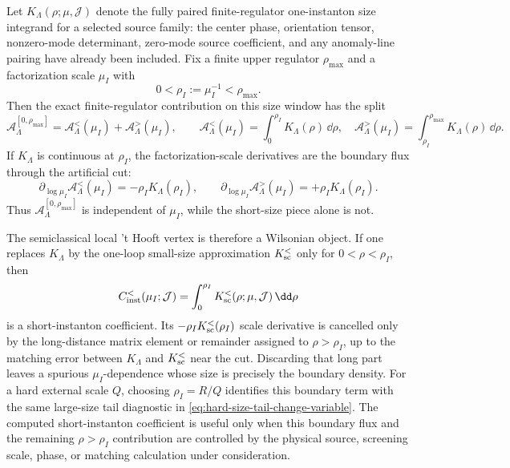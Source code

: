 \begin{controlledapproximation}
\label{ca:instanton-wilsonian-size-factorization}
Let \(K_{\Lambda}(\rho;\mu,\mathcal J)\) denote the fully paired
finite-regulator one-instanton size integrand for a selected source family:
the center phase, orientation tensor, nonzero-mode determinant, zero-mode
source coefficient, and any anomaly-line pairing have already been included.
Fix a finite upper regulator \(\rho_{\max}\) and a factorization scale
\(\mu_I\) with
\[
  0<\rho_I:=\mu_I^{-1}<\rho_{\max}.
\]
Then the exact finite-regulator contribution on this size window has the
split
\begin{equation}
  \mathcal A_{\Lambda}^{[0,\rho_{\max}]}
  =
  \mathcal A_{\Lambda}^{<}(\mu_I)
  +
  \mathcal A_{\Lambda}^{>}(\mu_I),
  \qquad
  \mathcal A_{\Lambda}^{<}(\mu_I)
  =
  \int_0^{\rho_I}K_\Lambda(\rho)\,\dd\rho ,
  \quad
  \mathcal A_{\Lambda}^{>}(\mu_I)
  =
  \int_{\rho_I}^{\rho_{\max}}K_\Lambda(\rho)\,\dd\rho .
  \label{eq:instanton-size-wilsonian-split}
\end{equation}
If \(K_\Lambda\) is continuous at \(\rho_I\), the factorization-scale
derivatives are the boundary flux through the artificial cut:
\begin{equation}
  \partial_{\log\mu_I}\mathcal A_{\Lambda}^{<}(\mu_I)
  =
  -\rho_I K_\Lambda(\rho_I),
  \qquad
  \partial_{\log\mu_I}\mathcal A_{\Lambda}^{>}(\mu_I)
  =
  +\rho_I K_\Lambda(\rho_I).
  \label{eq:instanton-size-factorization-boundary-flow}
\end{equation}
Thus \(\mathcal A_{\Lambda}^{[0,\rho_{\max}]}\) is independent of
\(\mu_I\), while the short-size piece alone is not.

The semiclassical local 't Hooft vertex is therefore a Wilsonian object.  If
one replaces \(K_\Lambda\) by the one-loop small-size approximation
\(K_{\rm sc}^{<}\) only for \(0<\rho<\rho_I\), then
\[
  C_{\rm inst}^{<}(\mu_I;\mathcal J)
  =
  \int_0^{\rho_I}K_{\rm sc}^{<}(\rho;\mu,\mathcal J)\,\dd\rho
\]
is a short-instanton coefficient.  Its
\(-\rho_IK_{\rm sc}^{<}(\rho_I)\) scale derivative is cancelled only by the
long-distance matrix element or remainder assigned to \(\rho>\rho_I\), up to
the matching error between \(K_\Lambda\) and \(K_{\rm sc}^{<}\) near the cut.
Discarding that long part leaves a spurious \(\mu_I\)-dependence whose size is
precisely the boundary density.  For a hard external scale \(Q\), choosing
\(\rho_I=R/Q\) identifies this boundary term with the same large-size tail
diagnostic in \eqref{eq:hard-size-tail-change-variable}.  The computed
short-instanton coefficient is useful only when this boundary flux and the
remaining \(\rho>\rho_I\) contribution are controlled by the physical source,
screening scale, phase, or matching calculation under consideration.
\end{controlledapproximation}

